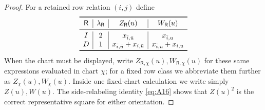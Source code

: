 \documentclass[11pt]{article}
\begin{document}
\begin{proof}
For a retained row relation $(i,j)$ define
\[
\begin{array}{c|c|c|c}
\toprule
\mathsf R&\lambda_{\mathsf R}&Z_{\mathsf R}(u)&W_{\mathsf R}(u)\\
\midrule
I&2&x_{\bar i,\bar u}&x_{\bar i,u}\\
D&1&x_{\bar i,\bar u}+x_{i,\bar u}
&x_{\bar i,u}+x_{i,u}\\
\bottomrule
\end{array}
\]
When the chart must be displayed, write
$Z_{\mathsf R,\chi}(u),W_{\mathsf R,\chi}(u)$ for these same expressions
evaluated in chart $\chi$; for a fixed row class we abbreviate them further as
$Z_\chi(u),W_\chi(u)$.  Inside one fixed-chart calculation we write simply
$Z(u),W(u)$.  The side-relabeling
identity \eqref{eq:A16} shows that $Z(u)^2$ is the correct representative
square for either orientation.


\end{proof}
\end{document}
